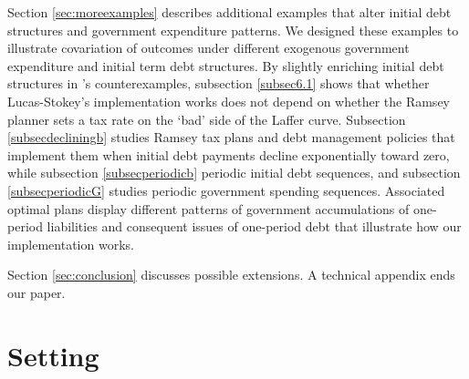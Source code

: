 \documentclass[12pt]{article}
\newcommand{\TS}[1]{{\textcolor{magenta}{#1}}}
\begin{document}
Section \ref{sec:moreexamples} describes additional examples that alter initial debt structures and government expenditure patterns. We  designed these examples to illustrate covariation of outcomes under different exogenous government expenditure and initial term debt structures. {By slightly enriching initial debt structures in \citeauthor{debortoli2021optimal}'s counterexamples, subsection \ref{subsec6.1} shows that  
whether  Lucas-Stokey's implementation  works does not depend on  whether the Ramsey planner sets a tax rate on the `bad' side of the Laffer curve. %
Subsection \ref{subsecdecliningb} studies Ramsey tax plans and debt management policies that implement them when
initial debt payments decline exponentially toward zero, while subsection \ref{subsecperiodicb} 
 periodic initial debt sequences, and subsection \ref{subsecperiodicG} studies periodic  government spending sequences.  Associated optimal plans display   different patterns of government  accumulations of one-period liabilities  and  consequent issues of one-period debt that illustrate how our implementation works.} 

Section \ref{sec:conclusion} discusses possible extensions. A technical appendix ends our paper. 


\section{Setting} \label{lssetting} 


\end{document}
